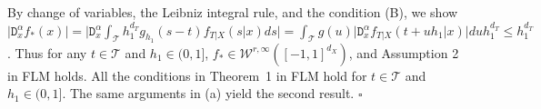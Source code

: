 \documentclass[lettersize, 12pt]{article}
\begin{document}
By change of variables, the Leibniz integral rule, and the condition (B), we show
$\big| \mathtt{D}_x^{\alpha} f_\ast(x) | 
=\big| \mathtt{D}_x^{\alpha} \int_{\mathcal{T}} h_1^{d_T} g_{h_1}(s-t) f_{T|X}(s|x) ds \big|
=  \int_{\mathcal{T}} g(u) \big|\mathtt{D}_x^{\alpha}  f_{T|X}(t+uh_1|x) \big| du h_1^{d_T}
\leq h_1^{d_T}$.
Thus for any $t\in\mathcal{T}$ and $h_1 \in (0,1]$, $f_\ast \in \mathcal{W}^{r,\infty}([-1,1]^{d_X})$, and Assumption 2 in FLM holds.
All the conditions in Theorem~1 in FLM hold for $t\in\mathcal{T}$ and $h_1 \in (0,1]$.
The same arguments in (a) yield the second result.
\hfill $\square$ 
\\ \\
%
%
\end{document}
